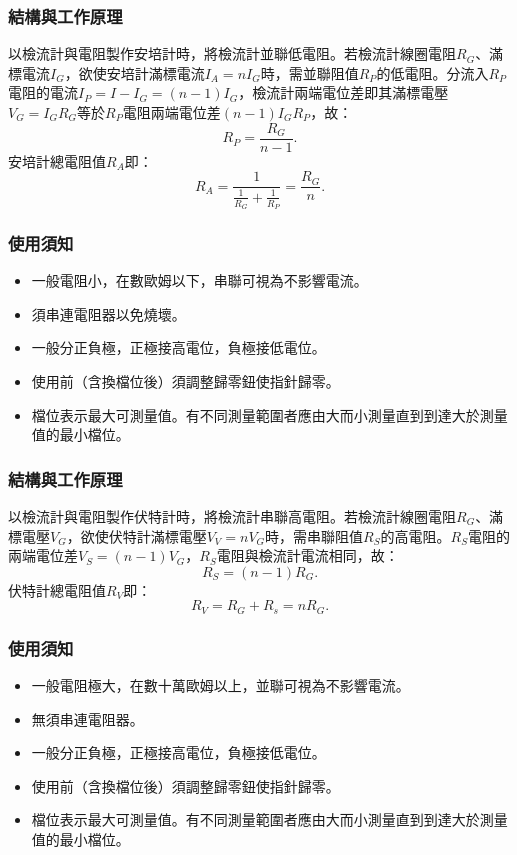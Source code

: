 \documentclass[a4paper,12pt]{report}
\begin{document}
\begin{itemize}
\subsubsection{結構與工作原理}
以檢流計與電阻製作安培計時，將檢流計並聯低電阻。若檢流計線圈電阻$R_G$、滿標電流$I_G$，欲使安培計滿標電流$I_A=nI_G$時，需並聯阻值$R_P$的低電阻。分流入$R_P$電阻的電流$I_P=I-I_G=(n-1)I_G$，檢流計兩端電位差即其滿標電壓$V_G=I_GR_G$等於$R_P$電阻兩端電位差$(n-1)I_GR_P$，故：
\[R_P=\frac{R_G}{n-1}.\]
安培計總電阻值$R_A$即：
\[R_A=\frac{1}{\frac{1}{R_G}+\frac{1}{R_P}}=\frac{R_G}{n}.\]
\subsubsection{使用須知}
\begin{itemize}
\item 一般電阻小，在數歐姆以下，串聯可視為不影響電流。
\item 須串連電阻器以免燒壞。
\item 一般分正負極，正極接高電位，負極接低電位。
\item 使用前（含換檔位後）須調整歸零鈕使指針歸零。
\item 檔位表示最大可測量值。有不同測量範圍者應由大而小測量直到到達大於測量值的最小檔位。
\end{itemize}
\subsubsection{結構與工作原理}
以檢流計與電阻製作伏特計時，將檢流計串聯高電阻。若檢流計線圈電阻$R_G$、滿標電壓$V_G$，欲使伏特計滿標電壓$V_V=nV_G$時，需串聯阻值$R_S$的高電阻。$R_S$電阻的兩端電位差$V_S=(n-1)V_G$，$R_S$電阻與檢流計電流相同，故：
\[R_S=(n-1)R_G.\]
伏特計總電阻值$R_V$即：
\[R_V=R_G+R_s=nR_G.\]
\subsubsection{使用須知}
\begin{itemize}
\item 一般電阻極大，在數十萬歐姆以上，並聯可視為不影響電流。
\item 無須串連電阻器。
\item 一般分正負極，正極接高電位，負極接低電位。
\item 使用前（含換檔位後）須調整歸零鈕使指針歸零。
\item 檔位表示最大可測量值。有不同測量範圍者應由大而小測量直到到達大於測量值的最小檔位。
\end{itemize}

\end{itemize}
\end{document}
